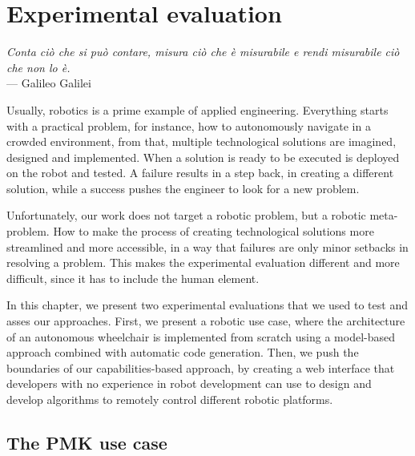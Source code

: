 \chapter[Experimental evaluation]{Experimental evaluation}\label{ch:Experiment}

\begin{flushright}{\slshape Conta ciò che si può contare, misura ciò che è misurabile e rendi misurabile ciò che non lo è.} \\ \medskip
    ---  Galileo Galilei
\end{flushright}

Usually, robotics is a prime example of applied engineering. Everything starts with a practical problem, for instance, how to autonomously navigate in a crowded environment, from that, multiple technological solutions are imagined, designed and implemented. When a solution is ready to be executed is deployed on the robot and tested. A failure results in a step back, in creating a different solution, while a success pushes the engineer to look for a new problem. 

Unfortunately, our work does not target a robotic problem, but a robotic meta-problem. How to make the process of creating technological solutions more streamlined and more accessible, in a way that failures are only minor setbacks in resolving a problem. This makes the experimental evaluation different and more difficult, since it has to include the human element.

In this chapter, we present two experimental evaluations that we used to test and asses our approaches. First, we present a robotic use case, where the architecture of an autonomous wheelchair is implemented from scratch using a model-based approach combined with automatic code generation. Then, we push the boundaries of our capabilities-based approach, by creating a web interface that developers with no experience in robot development can use to design and develop algorithms to remotely control different robotic platforms.

\newpage

\minitoc
\newpage

\section{The PMK use case}
\label{sec:pmk}

